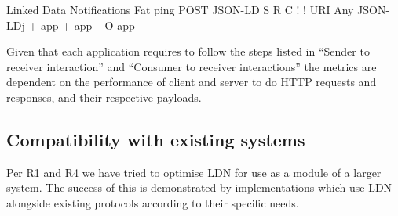                                             
                                                Linked Data Notifications
                                                Fat ping
                                                POST
                                                JSON-LD
                                                S R C
                                                !
                                                ! URI
                                                Any
                                                JSON-LDj
                                                + app
                                                + app
                                                –
                                                O app
                                            
                                        
                                    

                                    
\par Given that each application requires to follow the steps listed in ``\empty Sender to receiver interaction'' and ``\empty Consumer to receiver interactions'' the metrics are dependent on the performance of client and server to do HTTP requests and responses, and their respective payloads.
                                
                            

                            
                                \subsection{Compatibility with existing systems}
  \label{compatibility-with-existing-systems}

                                
                                    
\par Per \empty R1 and \empty R4 we have tried to optimise LDN for use as a module of a larger system. The success of this is demonstrated by implementations which use LDN alongside existing protocols according to their specific needs.

